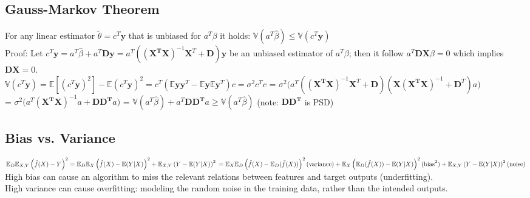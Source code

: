\subsection*{Gauss-Markov Theorem}
For any linear estimator $\widetilde{\theta}=c^T\mathbf{y}$ that is unbiased for $a^T\beta$ it holds: $\mathbb{V}(a^T\hat{\beta}) \leq \mathbb{V}(c^T\mathbf{y})$\\
Proof: Let $c^T \mathbf{y} = a^T\hat{\beta} + a^T\mathbf{D}\mathbf{y} = a^T((\mathbf{X^TX})^{-1}\mathbf{X}^T + \mathbf{D})\mathbf{y}$ be an unbiased estimator of $a^T \beta$; then it follow $a^T \mathbf{DX}\beta = 0$ which implies $\mathbf{DX} = 0$.\\
$\mathbb{V}(c^T \mathbf{y}) = \mathbb{E}[(c^T \mathbf{y})^2]-\mathbb{E}(c^T \mathbf{y})^2 = c^T(\mathbb{E}\mathbf{y}\mathbf{y}^T - \mathbb{E}\mathbf{y}\mathbb{E}\mathbf{y}^T)c = \sigma^2 c^T c $
= $\sigma^2 \big( a^T ((\mathbf{X^T X})^{-1}\mathbf{X}^T + \mathbf{D}) (\mathbf{X}(\mathbf{X^T X})^{-1}+\mathbf{D}^T)a \big )$\\
= $\sigma^2 \big( a^T (\mathbf{X^T X})^{-1}a +\mathbf{DD^T}a \big )$
= $\mathbb{V}(a^T\hat{\beta}) + a^T \mathbf{DD^T}a \geq \mathbb{V}(a^T\hat{\beta})$ (note: $\mathbf{DD^T}$ is PSD)

\subsection*{Bias vs. Variance}
\setlength{\mathindent}{0cm}
$
\mathbb{E}_D\mathbb{E}_{X,Y}\left(\hat{f}(X)-Y\right)^2 = \\
\mathbb{E}_D\mathbb{E}_X\left(\hat{f}(X) - \mathbb{E}(Y|X)\right)^2 + \mathbb{E}_{X,Y}\left(Y - \mathbb{E}(Y|X)\right)^2\\
= \mathbb{E}_X \mathbb{E}_D\left(\hat{f}(X) - \mathbb{E}_D(\hat{f}(X))\right)^2 \text{(variance)}\\
+ \mathbb{E}_X\left(\mathbb{E}_D(\hat{f}(X)) - \mathbb{E}(Y|X)\right)^2 \text{(bias}^2)\\
+ \mathbb{E}_{X,Y}\left(Y - \mathbb{E}(Y|X)\right)^2 \text{(noise)}
$\\
High bias can cause an algorithm to miss the relevant relations between features and target outputs (underfitting).\\
High variance can cause overfitting: modeling the random noise in the training data, rather than the intended outputs.

